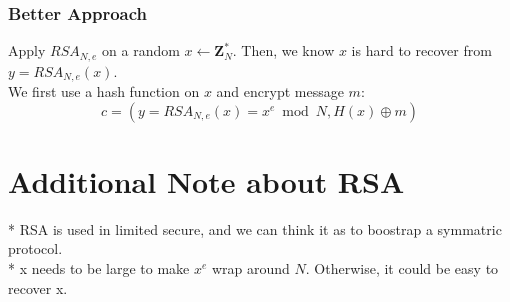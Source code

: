 \documentclass{scribe}
\begin{document}

\subsubsection{Better Approach}
Apply $RSA_{N,e}$ on a random $x \leftarrow \mathbf{Z}_N^*$. Then, we know $x$ is hard to recover from $y=RSA_{N,e}(x)$.
\\
We first use a hash function on $x$ and encrypt message $m$:
\[c = (y=RSA_{N,e}(x) = x^e \bmod N, H(x) \oplus m)\]  

\section{Additional Note about RSA}
* RSA is used in limited secure, and we can think it as to boostrap a symmatric protocol.
\\
* x needs to be large to make $x^e$ wrap around $N$. Otherwise, it could be easy to recover x.


%

\end{document}
